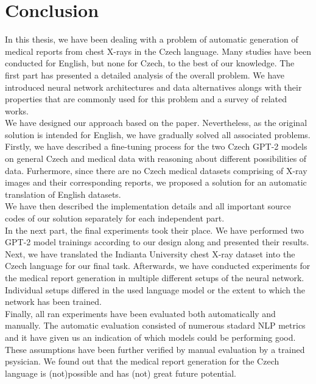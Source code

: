 \chapter*{Conclusion}

In this thesis, we have been dealing with a problem of automatic generation of medical reports from chest X-rays in the Czech language. Many studies have been conducted for English, but none for Czech, to the best of our knowledge. The first part has presented a detailed analysis of the overall problem. We have introduced neural network architectures and data alternatives alongs with their properties that are commonly used for this problem and a survey of related works.\\

We have designed our approach based on the \citet{alfarghaly2021automated} paper. Nevertheless, as the original solution is intended for English, we have gradually solved all associated problems. Firstly, we have described a fine-tuning process for the two Czech GPT-2 models on general Czech and medical data with reasoning about different possibilities of data. Furhermore, since there are no Czech medical datasets comprising of X-ray images and their corresponding reports, we proposed a solution for an automatic translation of English datasets. \\

We have then described the implementation details and all important source codes of our solution separately for each independent part.\\

In the next part, the final experiments took their place. We have performed two GPT-2 model trainings according to our design along and presented their results. Next, we have translated the Indianta University chest X-ray dataset into the Czech language for our final task. Afterwards, we have conducted experiments for the medical report generation in multiple different setups of the neural network. Individual setups differed in the used language model or the extent to which the network has been trained.\\

Finally, all ran experiments have been evaluated both automatically and manually. The automatic evaluation consisted of numerous stadard NLP metrics and it have given us an indication of which models could be performing good. These assumptions have been further verified by manual evaluation by a trained psysician. We found out that the medical report generation for the Czech language is (not)possible and has (not) great future potential.
\newpage


